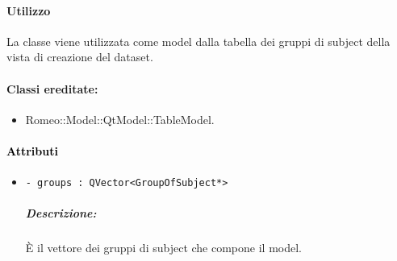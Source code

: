 \paragraph{Utilizzo\\}
La classe viene utilizzata come model dalla tabella dei gruppi di subject\g{} della vista di creazione del dataset\g{}.

\paragraph{Classi ereditate:}
\begin{itemize}
	\item Romeo::Model::QtModel::TableModel.
\end{itemize}

\paragraph{\textcolor{black}{Attributi\\}}
	\begin{itemize}
		\item \color{teal}\verb!- groups : QVector<GroupOfSubject*>!
		\color{black}
		\subparagraph{Descrizione:} È il vettore dei gruppi di subject\g{} che compone il model.
	\end{itemize}
	
